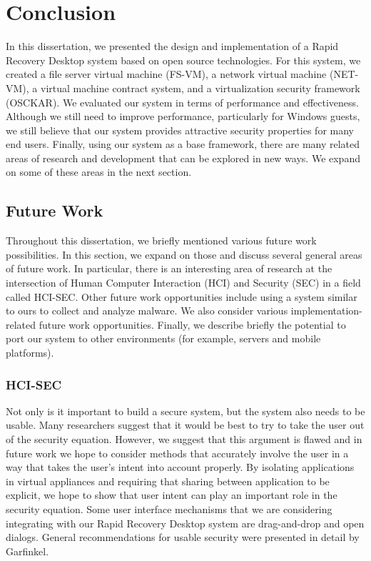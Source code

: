 
\chapter{Conclusion}

In this dissertation, we presented the design and implementation of a Rapid Recovery Desktop system based on open source technologies. For this system, we created a file server virtual machine (FS-VM), a network virtual machine (NET-VM), a virtual machine contract system, and a virtualization security framework (OSCKAR). We evaluated our system in terms of performance and effectiveness. Although we still need to improve performance, particularly for Windows guests, we still believe that our system provides attractive security properties for many end users. Finally, using our system as a base framework, there are many related areas of research and development that can be explored in new ways. We expand on some of these areas in the next section.

\section{Future Work}
\label{sec:FutureWork}

Throughout this dissertation, we briefly mentioned various future work possibilities. In this section, we expand on those and discuss several general areas of future work. In particular, there is an interesting area of research at the intersection of Human Computer Interaction (HCI) and Security (SEC) in a field called HCI-SEC. Other future work opportunities include using a system similar to ours to collect and analyze malware. We also consider various implementation-related future work opportunities. Finally, we describe briefly the potential to port our system to other environments (for example, servers and mobile platforms).

\subsection{HCI-SEC}

Not only is it important to build a secure system, but the system also needs to be usable. Many researchers suggest that it would be best to try to take the user out of the security equation\cite{cranor_2008}. However, we suggest that this argument is flawed and in future work we hope to consider methods that accurately involve the user in a way that takes the user's intent into account properly. By isolating applications in virtual appliances and requiring that sharing between application to be explicit, we hope to show that user intent can play an important role in the security equation. Some user interface mechanisms that we are considering integrating with our Rapid Recovery Desktop system are drag-and-drop and open dialogs. General recommendations for usable security were presented in detail by Garfinkel\cite{simson_2006}.

